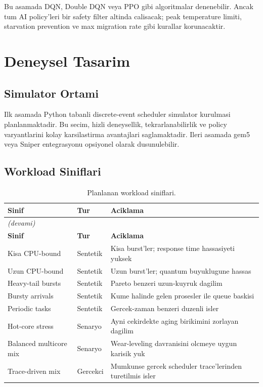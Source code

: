 \documentclass[12pt,a4paper]{article}
\begin{document}
Bu asamada DQN, Double DQN veya PPO gibi algoritmalar denenebilir. Ancak tum AI policy'leri bir safety filter altinda
calisacak; peak temperature limiti, starvation prevention ve max migration rate gibi kurallar korunacaktir.

\section{Deneysel Tasarim}

\subsection{Simulator Ortami}

Ilk asamada Python tabanli discrete-event scheduler simulator kurulmasi planlanmaktadir. Bu secim, hizli deneysellik,
tekrarlanabilirlik ve policy varyantlarini kolay karsilastirma avantajlari saglamaktadir. Ileri asamada gem5 veya Sniper
entegrasyonu opsiyonel olarak dusunulebilir.

\subsection{Workload Siniflari}

\begin{longtable}{@{}p{3.3cm}p{2.1cm}p{8.0cm}@{}}
\caption{Planlanan workload siniflari.}\\
\toprule
\textbf{Sinif} & \textbf{Tur} & \textbf{Aciklama} \\
\midrule
\endfirsthead
\multicolumn{3}{l}{\small\itshape (devami)}\\
\toprule
\textbf{Sinif} & \textbf{Tur} & \textbf{Aciklama} \\
\midrule
\endhead
\bottomrule
\endfoot

Kisa CPU-bound & Sentetik & Kisa burst'ler; response time hassasiyeti yuksek \\
Uzun CPU-bound & Sentetik & Uzun burst'ler; quantum buyuklugune hassas \\
Heavy-tail bursts & Sentetik & Pareto benzeri uzun-kuyruk dagilim \\
Bursty arrivals & Sentetik & Kume halinde gelen prosesler ile queue baskisi \\
Periodic tasks & Sentetik & Gercek-zaman benzeri duzenli isler \\
Hot-core stress & Senaryo & Ayni cekirdekte aging birikimini zorlayan dagilim \\
Balanced multicore mix & Senaryo & Wear-leveling davranisini olcmeye uygun karisik yuk \\
Trace-driven mix & Gercekci & Mumkunse gercek scheduler trace'lerinden turetilmis isler \\
\end{longtable}
\end{document}
